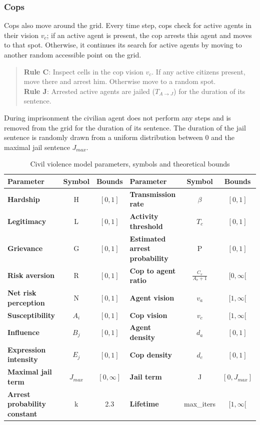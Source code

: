\documentclass[10pt]{article}
\begin{document}
    \subsubsection{Cops}
    \label{section:cop_entity}

    Cops also move around the grid. Every time step, cops check for active agents in their vision $v_c$; if an active agent is present, the cop arrests this agent and moves to that spot. Otherwise, it continues its search for active agents by moving to another random accessible point on the grid.

    \begin{quote}
        \textbf{Rule C}: Inspect cells in the cop vision $v_c$. If any active citizens present, move there and arrest him. Otherwise move to a random spot.\\
        \textbf{Rule J}: Arrested active agents are jailed ($T_{A \rightarrow J}$) for the duration of its sentence.
    \end{quote}

    During imprisonment the civilian agent does not perform any steps and is removed from the grid for the duration of its sentence. The duration of the jail sentence is randomly drawn from a uniform distribution between 0 and the maximal jail sentence $J_{max}$.

    \begin{table}[h]
        \centering
        \begin{tabular}{||>{\bfseries}l c c || >{\bfseries}l c c||}
            \hline
            Parameter & Symbol & Bounds & Parameter & Symbol & Bounds \\
            \hline
            \hline
            Hardship & H & $[0,1]$ & Transmission rate & $\beta$ & $[0,1]$ \\
            Legitimacy & L & $[0,1]$ & Activity threshold & $T_c$ & $[0,1]$ \\
            Grievance & G & $[0,1]$ & Estimated arrest probability & P & $[0,1]$ \\
            Risk aversion & R & $[0,1]$ & Cop to agent ratio & $\frac{C_v}{A_v + 1}$ & $[0,\infty[$ \\
            Net risk perception & N & $[0,1]$ & Agent vision & $v_a$ & $[1, \infty[$ \\
            Susceptibility & $A_i$ & $[0, 1]$ & Cop vision & $v_c$ & $[1, \infty[$ \\
            Influence & $B_j$ & $[0,1]$ & Agent density & $d_a$ & $[0,1]$ \\
            Expression intensity & $E_j$ & $[0,1]$ & Cop density & $d_c$ & $[0,1]$ \\
            Maximal jail term & $J_{max}$ & $[0, \infty]$ & Jail term & J & $[0,J_{max}]$ \\
            Arrest probability constant & k & 2.3 & Lifetime & max\_iters & $[1, \infty[$ \\
            \hline
        \end{tabular}
        \caption{Civil violence model parameters, symbols and theoretical bounds}
        \label{table:parameter_descriptions}
    \end{table}
\end{document}
